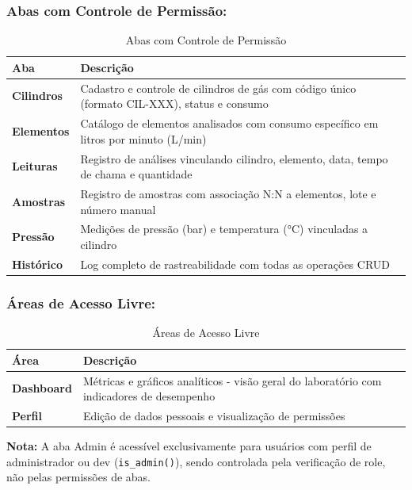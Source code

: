 \documentclass[12pt,a4paper]{article}
\begin{document}
\subsubsection{Abas com Controle de Permissão:}

\begin{table}[h!]
\centering
\caption{Abas com Controle de Permissão}
\label{tab:abas-controladas}
\begin{tabular}{@{}ll@{}}
\toprule
\textbf{Aba} & \textbf{Descrição} \\
\midrule
\textbf{Cilindros} & Cadastro e controle de cilindros de gás com código único (formato CIL-XXX), status e consumo \\
\textbf{Elementos} & Catálogo de elementos analisados com consumo específico em litros por minuto (L/min) \\
\textbf{Leituras} & Registro de análises vinculando cilindro, elemento, data, tempo de chama e quantidade \\
\textbf{Amostras} & Registro de amostras com associação N:N a elementos, lote e número manual \\
\textbf{Pressão} & Medições de pressão (bar) e temperatura (°C) vinculadas a cilindro \\
\textbf{Histórico} & Log completo de rastreabilidade com todas as operações CRUD \\
\bottomrule
\end{tabular}
\end{table}

\subsubsection{Áreas de Acesso Livre:}

\begin{table}[h!]
\centering
\caption{Áreas de Acesso Livre}
\label{tab:abas-livres}
\begin{tabular}{@{}ll@{}}
\toprule
\textbf{Área} & \textbf{Descrição} \\
\midrule
\textbf{Dashboard} & Métricas e gráficos analíticos - visão geral do laboratório com indicadores de desempenho \\
\textbf{Perfil} & Edição de dados pessoais e visualização de permissões \\
\bottomrule
\end{tabular}
\end{table}

\textbf{Nota:} A aba Admin é acessível exclusivamente para usuários com perfil de administrador ou dev (\texttt{is\_admin()}), sendo controlada pela verificação de role, não pelas permissões de abas.
\end{document}

